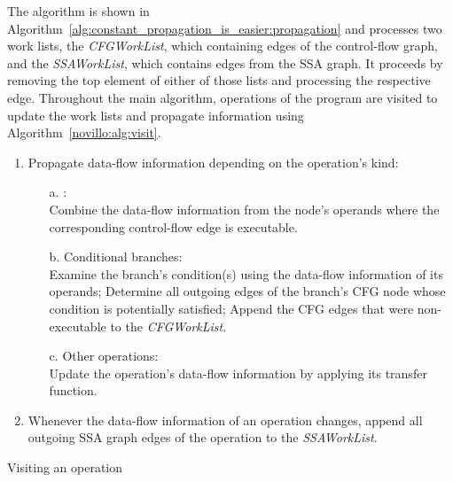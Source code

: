 The algorithm is shown in Algorithm~\ref{alg:constant_propagation_is_easier:propagation} and processes two work lists, the \emph{CFGWorkList}, which containing edges of the control-flow graph, and the \emph{SSA\-Work\-List}, which contains edges from the SSA graph. 
It proceeds by removing the top element of either of those lists and processing the respective edge. 
Throughout the main algorithm, operations of the program are visited to update the work lists and propagate information using Algorithm~\ref{novillo:alg:visit}.

\begin{algorithm}[t!]
  \begin{enumerate}
    \item Propagate data-flow information depending on the operation's kind:
    \begin{enumerate}
      \vspace{-1.2ex}
      \item[a.] \label{novillo:alg:visit:phi} \phifuns: \\
                Combine the data-flow information from the node's operands where
                the corresponding control-flow edge is executable.
      \item[b.] \label{novillo:alg:visit:branch} Conditional branches: \\
                Examine the branch's condition(s) using the data-flow
                information of its operands; Determine all outgoing edges of the
                branch's CFG node whose condition is potentially satisfied;
                Append the CFG edges that were non-executable to the
                \emph{CFGWorkList}.
      \item[c.] \label{novillo:alg:visit:regular} Other operations:\\
                Update the operation's data-flow information by applying its 
                transfer function.
    \end{enumerate}
    \vspace{-1ex}
    \item Whenever the data-flow information of an operation changes, append all
          outgoing SSA graph edges of the operation to the \emph{SSAWorkList}.
  \end{enumerate}
  \caption{Visiting an operation}
  \label{novillo:alg:visit}
\end{algorithm}

